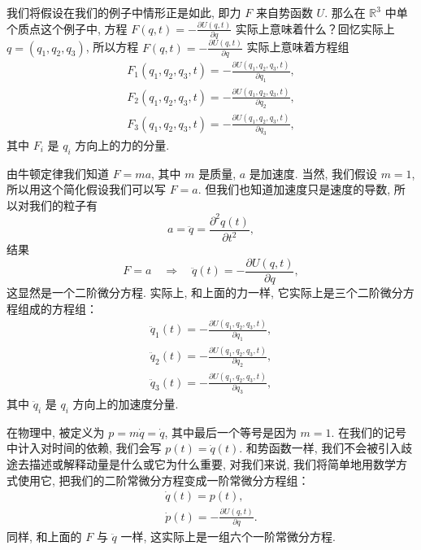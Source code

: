 我们将假设在我们的例子中情形正是如此, 即力 $F$ 来自势函数 $U$. 那么在 $\mathbb{R}^3$ 中单个质点这个例子中, 方程 $F(q,t)=-\frac{\partial U(q,t)}{\partial q}$ 实际上意味着什么？回忆实际上 $q=(q_1,q_2,q_3)$, 所以方程 $F(q,t)=-\frac{\partial U(q,t)}{\partial q}$ 实际上意味着方程组
\begin{align*}
F_1(q_1,q_2,q_3,t)=-\frac{\partial U(q_1,q_2,q_3,t)}{\partial q_1}, \\
F_2(q_1,q_2,q_3,t)=-\frac{\partial U(q_1,q_2,q_3,t)}{\partial q_2}, \\
F_3(q_1,q_2,q_3,t)=-\frac{\partial U(q_1,q_2,q_3,t)}{\partial q_3},
\end{align*}
其中 $F_i$ 是 $q_i$ 方向上的力的分量.

由牛顿定律我们知道 $F=ma$, 其中 $m$ 是质量, $a$ 是加速度. 当然, 我们假设 $m=1$, 所以用这个简化假设我们可以写 $F=a$. 但我们也知道加速度只是速度的导数, 所以对我们的粒子有
\[
a=\ddot{q}=\frac{\partial^2q(t)}{\partial t^2},
\]
结果
\[
F=a\quad\Rightarrow\quad\ddot{q}(t)=-\frac{\partial U(q,t)}{\partial q},
\]
这显然是一个二阶微分方程. 实际上, 和上面的力一样, 它实际上是三个二阶微分方程组成的方程组：
\begin{align*}
\ddot{q}_1(t)=-\frac{\partial U(q_1,q_2,q_3,t)}{\partial q_1}, \\
\ddot{q}_2(t)=-\frac{\partial U(q_1,q_2,q_3,t)}{\partial q_2}, \\
\ddot{q}_3(t)=-\frac{\partial U(q_1,q_2,q_3,t)}{\partial q_3},
\end{align*}
其中 $\ddot{q}_i$ 是 $q_i$ 方向上的加速度分量.

在物理中, 被定义为 $p=m\dot{q}=\dot{q}$, 其中最后一个等号是因为 $m=1$. 在我们的记号中计入对时间的依赖, 我们会写 $p(t)=\dot{q}(t)$. 和势函数一样, 我们不会被引入歧途去描述或解释动量是什么或它为什么重要, 对我们来说, 我们将简单地用数学方式使用它, 把我们的二阶常微分方程变成一阶常微分方程组：
\begin{align*}
\dot{q}(t)=p(t), \\
\dot{p}(t)=-\frac{\partial U(q,t)}{\partial q}.
\end{align*}
同样, 和上面的 $F$ 与 $\ddot{q}$ 一样, 这实际上是一组六个一阶常微分方程.

